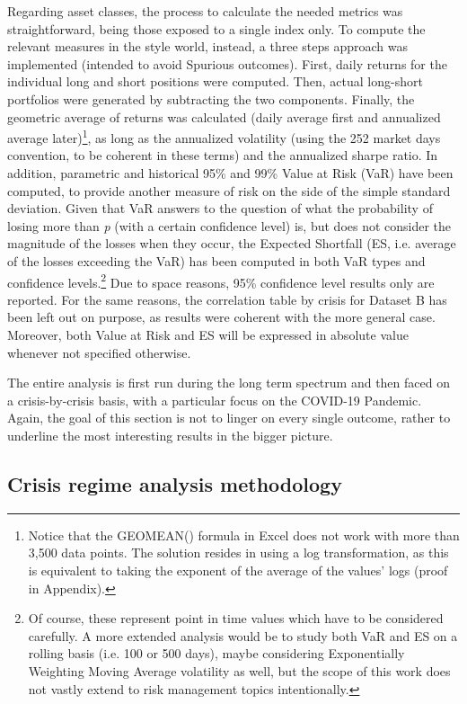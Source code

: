 \documentclass[12pt]{article}
\begin{document}
Regarding asset classes, the process to calculate the needed metrics was straightforward, being those exposed to a single index only. To compute the relevant measures in the style world, instead, a three steps approach was implemented (intended to avoid Spurious outcomes). First, daily returns for the individual long and short positions were computed. Then, actual long-short portfolios were generated by subtracting the two components. Finally, the geometric average of returns was calculated (daily average first and annualized average later)\footnote{Notice that the GEOMEAN() formula in Excel does not work with more than 3,500 data points. The solution resides in using a log transformation, as this is equivalent to taking the exponent of the average of the values' logs (proof in Appendix).}, as long as the annualized volatility (using the 252 market days convention, to be coherent in these terms) and the annualized sharpe ratio. In addition, parametric and historical 95\% and 99\% Value at Risk (VaR) have been computed, to provide another measure of risk on the side of the simple standard deviation. Given that VaR answers to the question of what the probability of losing more than \textit{p} (with a certain confidence level) is, but does not consider the magnitude of the losses when they occur, the Expected Shortfall (ES, i.e. average of the losses exceeding the VaR) has been computed in both VaR types and confidence levels.\footnote{Of course, these represent point in time values which have to be considered carefully. A more extended analysis would be to study both VaR and ES on a rolling basis (i.e. 100 or 500 days), maybe considering Exponentially Weighting Moving Average volatility as well, but the scope of this work does not vastly extend to risk management topics intentionally.} Due to space reasons, 95\% confidence level results only are reported. For the same reasons, the correlation table by crisis for Dataset B has been left out on purpose, as results were coherent with the more general case. Moreover,  both Value at Risk and ES will be expressed in absolute value whenever not specified otherwise.

The entire analysis is first run during the long term spectrum and then faced on a crisis-by-crisis basis, with a particular focus on the COVID-19 Pandemic. Again, the goal of this section is not to linger on every single outcome, rather to underline the most interesting results in the bigger picture. 

\subsection{Crisis regime analysis methodology}
\end{document}
